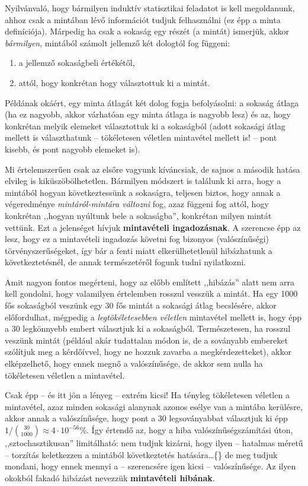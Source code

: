 \documentclass[
]{book}
\providecommand{\tightlist}{%
  \setlength{\itemsep}{0pt}\setlength{\parskip}{0pt}}
\begin{document}
Nyilvánvaló, hogy bármilyen induktív statisztikai feladatot is kell megoldanunk, ahhoz csak a mintában lévő információt tudjuk felhasználni (ez épp a minta definíciója). Márpedig ha csak a sokaság egy részét (a mintát) ismerjük, akkor \emph{bármilyen}, mintából számolt jellemző két dologtól fog függeni:

\begin{enumerate}
\def\labelenumi{\arabic{enumi}.}
\tightlist
\item
  a jellemző sokaságbeli értékétől,
\item
  attól, hogy konkrétan hogy választottuk ki a mintát.
\end{enumerate}

Példának okáért, egy minta átlagát két dolog fogja befolyásolni: a sokaság átlaga (ha ez nagyobb, akkor várhatóan egy minta átlaga is nagyobb lesz) és az, hogy konkrétan melyik elemeket választottuk ki a sokaságból (adott sokasági átlag mellett is választhatunk -- tökéletesen véletlen mintavétel mellett is! -- pont kisebb, és pont nagyobb elemeket is).

Mi értelemszerűen csak az elsőre vagyunk kíváncsiak, de sajnos a második hatása elvileg is kiküszöbölhetetlen. Bármilyen módszert is találunk ki arra, hogy a mintából hogyan következtessünk a sokaságra, teljesen biztos, hogy annak a végeredménye \emph{mintáról-mintára változni} fog, azaz függeni fog attól, hogy konkrétan ,,hogyan nyúltunk bele a sokaságba'', konkrétan milyen mintát vettünk. Ezt a jelenséget hívjuk \textbf{mintavételi ingadozásnak}. A szerencse épp az lesz, hogy ez a mintavételi ingadozás követni fog bizonyos (valószínűségi) törvényszerűségeket, így bár a fenti miatt elkerülhetetlenül hibázhatunk a következtetésnél, de annak természetéről fogunk tudni nyilatkozni.

Amit nagyon fontos megérteni, hogy az előbb említett ,,hibázás'' alatt nem arra kell gondolni, hogy valamilyen értelemben rosszul vesszük a mintát. Ha egy 1000 fős sokaságból veszünk egy 30 fős mintát a sokasági átlag becslésére, akkor előfordulhat, mégpedig a \emph{legtökéletesebben véletlen} mintavétel mellett is, hogy épp a 30 legkönnyebb embert választjuk ki a sokaságból. Természetesen, ha rosszul veszünk mintát (például akár tudattalan módon is, de a soványabb embereket szólítjuk meg a kérdőívvel, hogy ne hozzuk zavarba a megkérdezetteket), akkor elképzelhető, hogy ennek megnő a valószínűsége, de akkor sem nulla ha tökéletesen véletlen a mintavétel.

Csak épp -- és itt jön a lényeg -- extrém kicsi! Ha tényleg tökéletesen véletlen a mintavétel, azaz minden sokasági alanynak azonos esélye van a mintába kerülésre, akkor annak a valószínűsége, hogy pont a 30 legsoványabbat választjuk ki épp \(1/\binom{30}{1000}\approx 4\cdot 10^{-56}\)\%. Így értendő az, hogy a hiba valószínűségszámítási úton, ,,sztochasztikusan'' limitálható: nem tudjuk kizárni, hogy ilyen -- hatalmas méretű -- torzítás keletkezzen a mintából következtetés hatására\dots\{\} de meg tudjuk mondani, hogy ennek mennyi a -- szerencsére igen kicsi -- valószínűsége. Az ilyen okokból fakadó hibázást nevezzük \textbf{mintavételi hibának}.
\end{document}
